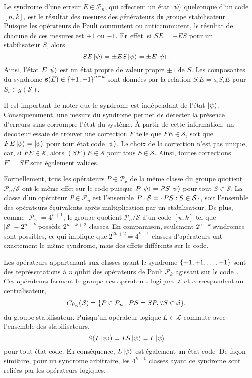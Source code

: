 Le syndrome d'une erreur $E \in \mathcal P_n$,
qui affectent un état $\ket\psi$ quelconque d'un code $[n, k]$,
est le résultat des mesures des générateurs du groupe stabilisateur.
Puisque les opérateurs de Pauli commutent ou anticommutent,
le résultat de chacune de ces mesures est $+1$ ou $-1$.
En effet, si $SE = \pm ES$ pour un stabilisateur $S$,
alors
\begin{equation}
  SE\ket\psi = \pm E S \ket\psi = \pm E\ket\psi.
\end{equation}
Ainsi,
l'état $E\ket\psi$ est un état propre de valeur propre $\pm 1$ de $S$.
Les composantes du syndrome $\vb{s}(E) \in \qty{+1, -1}^{n - k}$
sont données par la relation $S_iE = s_i S_i E$ pour $S_i \in g(\mathcal S)$.

Il est important de noter que le syndrome est indépendant de l'état $\ket \psi$.
Conséquemment,
une mesure du syndrome permet de détecter la présence d'erreurs sans corrompre l'état du système.
À partir de cette information,
un décodeur essaie de trouver une correction $F$ telle que $FE \in \mathcal S$, 
soit que $FE\ket\psi = \ket\psi$ pour tout état code $\ket\psi$.
Le choix de la correction n'est pas unique, car, si $FE \in \mathcal S$,
alors $(SF)E \in \mathcal S$ pour tous $S \in \mathcal S$.
Ainsi,
toutes corrections $F' = SF$ sont également valides.

Formellement,
tous les opérateurs $P \in \mathcal P_n$ de la même classe du groupe quotient $\mathcal P_n/\mathcal S$
ont le même effet sur le code puisque $P\ket\psi = PS\ket\psi$ pour tout $S \in \mathcal S$.
La classe d'un opérateur $P \in \mathcal P_n$ est l'ensemble $P\cdot \mathcal S = \qty{PS : S\in \mathcal S}$,
soit l'ensemble des opérateurs équivalents après multiplication par un stabilisateur.
De plus,
comme $|\mathcal P_n| = 4^{n+1}$,
le groupe quotient $\mathcal P_n/\mathcal S$ d'un code $[n, k]$ tel que $|\mathcal S| = 2^{n - k}$
possède $2^{n+k+2}$ classes.
En comparaison,
seulement $2^{n-k}$ syndromes sont possibles,
ce qui implique que $2^{2k + 2} = 4^{k + 1}$ classes d'opérateurs ont exactement le même syndrome,
mais des effets différents sur le code.

Les opérateurs appartenant aux classes ayant le syndrome $\qty{+1, +1, \ldots, +1}$
sont des représentations à $n$ qubit des opérateurs de Pauli $\mathcal P_k$
agissant sur le code~\cite{aaronson_improved_2004}.
Ces opérateurs forment le groupe des opérateurs logiques $\mathcal L$ et correspondent
au centralisateur,
\begin{align}
  C_{\mathcal P_n}(\mathcal S) 
  = \qty{P \in \mathcal P_n : PS = SP, \forall S \in \mathcal S},
\end{align}
du groupe stabilisateur.
Puisqu'un opérateur logique $L \in \mathcal L$ commute avec l'ensemble des stabilisateurs,
\begin{equation}
  S(L\ket\psi) = LS\ket\psi = L\ket\psi
\end{equation}
pour tout état code.
En conséquence,
$L\ket\psi$ est également un état code.
De façon similaire,
pour un syndrome arbitraire,
les $4^{k+1}$ classes ayant ce syndrome sont reliées par les opérateurs logiques.

